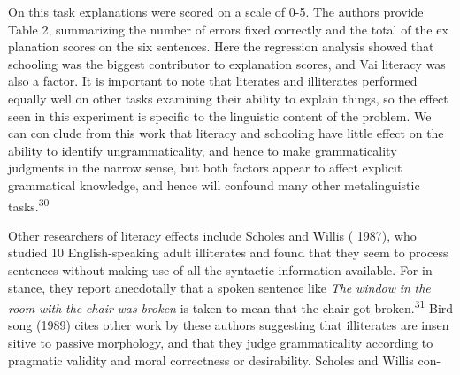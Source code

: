 \begin{styleTextbody}
On this task explanations were scored on a scale of 0-5. The authors provide Table 2, summarizing the number of errors fixed correctly and the total of the ex\- planation scores on the six sentences. Here the regression analysis showed that schooling was the biggest contributor to explanation scores, and Vai literacy was also a factor. It is important to note that literates and illiterates performed equally well on other tasks examining their ability to explain things, so the effect seen in this experiment is specific to the linguistic content of the problem. We can con\- clude from this work that literacy and schooling have little effect on the ability to identify ungrammaticality, and hence to make grammaticality judgments in the narrow sense, but both factors appear to affect explicit grammatical knowledge, and hence will confound many other metalinguistic tasks.\textsuperscript{30}
\end{styleTextbody}


\begin{styleTextbody}
Other researchers of literacy effects include Scholes and Willis ( 1987), who studied 10 English-speaking adult illiterates and found that they seem to process sentences without making use of all the syntactic information available. For in\- stance, they report anecdotally that a spoken sentence like \textit{The}\textit{ }\textit{window}\textit{ }\textit{in}\textit{ }\textit{the}\textit{ }\textit{room}\textit{ }\textit{with}\textit{ }\textit{the}\textit{ }\textit{chair}\textit{ }\textit{was}\textit{ }\textit{broken}\textit{ }is taken to mean that the chair got broken.\textsuperscript{31}\textsuperscript{ }Bird\- song (1989) cites other work by these authors suggesting that illiterates are insen\- sitive to passive morphology, and that they judge grammaticality according to pragmatic validity and moral correctness or desirability. Scholes and Willis con-
\end{styleTextbody}


